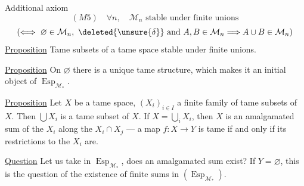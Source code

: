 Additional axiom
\[
 (M5)\quad \forall n,\quad \mathcal M_n\text{ stable under finite unions}
\]
\[
 (\Longleftrightarrow\ \varnothing\in\mathcal M_n,\ \deleted{\unsure{\delta}}\text{ and }A,B\in\mathcal M_n\Longrightarrow A\cup B\in\mathcal M_n)
\]
\uline{Proposition} Tame subsets of a tame space stable under finite unions.

\uline{Proposition} On $\varnothing$ there is a unique tame structure, which makes it an initial object of $\operatorname{Esp}_{\mathcal M_*}$.

\uline{Proposition} Let $X$ be a tame space, $(X_i)_{i\in I}$ a finite family of tame subsets of $X$. Then $\bigcup X_i$ is a tame subset of $X$. If $X=\bigcup_iX_i$, then $X$ is an amalgamated sum of the $X_i$ along the $X_i\cap X_j$ --- a map $f:X\longrightarrow Y$  is tame if and only if its restrictions to the $X_i$ are.

\uline{Question} Let us take
in $\operatorname{Esp}_{\mathcal M_*}$, does an amalgamated sum exist? If $Y=\varnothing$, this is the question of the existence of finite sums in $(\operatorname{Esp}_{\mathcal M_*})$.
